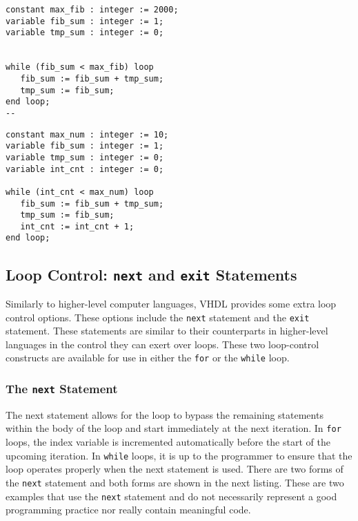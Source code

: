 \vspace{10pt}
\noindent
\begin{minipage}{0.5\linewidth}
\begin{lstlisting}
constant max_fib : integer := 2000;
variable fib_sum : integer := 1;
variable tmp_sum : integer := 0;


while (fib_sum < max_fib) loop
   fib_sum := fib_sum + tmp_sum;
   tmp_sum := fib_sum;
end loop;
--
\end{lstlisting}
\end{minipage}
\noindent
\begin{minipage}{0.5\linewidth}
\begin{lstlisting}
constant max_num : integer := 10; 
variable fib_sum : integer := 1; 
variable tmp_sum : integer := 0; 
variable int_cnt : integer := 0; 

while (int_cnt < max_num) loop
   fib_sum := fib_sum + tmp_sum; 
   tmp_sum := fib_sum; 
   int_cnt := int_cnt + 1; 
end loop;
\end{lstlisting}
\end{minipage}

\subsection{Loop Control: \texttt{next} and \texttt{exit} Statements}

Similarly to higher-level computer languages, VHDL provides some extra loop control options. These options include the \texttt{next} statement and the \texttt{exit} statement. These statements are similar to their counterparts in higher-level languages in the control they can exert over loops. These two loop-control constructs are available for use in either the \texttt{for} or the \texttt{while} loop. 

\subsubsection{The \texttt{next} Statement}
The next statement allows for the loop to bypass the remaining statements within the body of the loop and start immediately at the next iteration. In \texttt{for} loops, the index variable is incremented automatically before the start of the upcoming iteration. In \texttt{while} loops, it is up to the programmer to ensure that the loop operates properly when the next statement is used. There are two forms of the \texttt{next} statement and both forms are shown in the next listing. These are two examples that use the \texttt{next} statement and do not necessarily represent a good programming practice nor really contain meaningful code.

